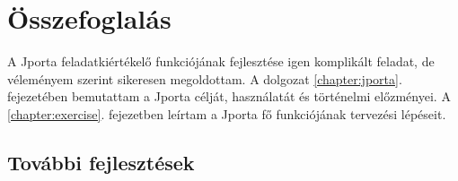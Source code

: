 \chapter*{Összefoglalás}

A Jporta feladatkiértékelő funkciójának fejlesztése igen komplikált feladat, de véleményem szerint sikeresen megoldottam.
A dolgozat \ref{chapter:jporta}. fejezetében bemutattam a Jporta célját, használatát és történelmi előzményei.
A \ref{chapter:exercise}. fejezetben leírtam a Jporta fő funkciójának tervezési lépéseit.

\section*{További fejlesztések}
